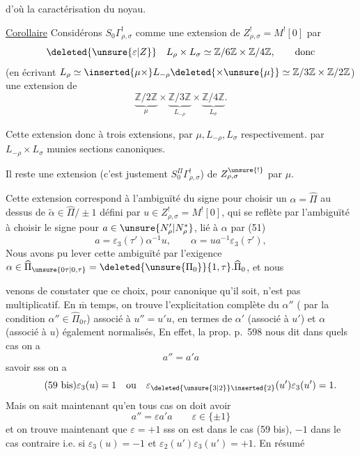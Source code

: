 
d'où la caractérisation du noyau.

\uline{Corollaire} Considérons  $S_0\Gamma^!_{\rho,\sigma}$ comme une extension de $Z^!_{\rho,\sigma}=M^![0]$ par
\[
\deleted{\unsure{\varepsilon|Z}}\quad
L_\rho\times L_\sigma\simeq\mathbb Z/6\mathbb Z\times\mathbb Z/4\mathbb Z,
\qquad\text{donc}
\]
(en écrivant $L_\rho\simeq\inserted{\mu\times}L_{-\rho}\deleted{\times\unsure{\mu}}\simeq\mathbb Z/3\mathbb Z\times\mathbb Z/2\mathbb Z$)
une extension de
\[
\underbrace{\mathbb Z/2\mathbb Z}_{\mu}\times
\underbrace{\mathbb Z/3\mathbb Z}_{L_{-\rho}}\times
\underbrace{\mathbb Z/4\mathbb Z}_{L_\sigma}.
\]


Cette extension  donc  à trois extensions, par $\mu,L_{-\rho},L_\sigma$ respectivement.   par $L_{-\rho}\times L_\sigma$  munies  sections canoniques.

Il reste une extension (c'est justement $S_0^\Pi\Gamma^!_{\rho,\sigma}$) de $Z^{\unsure{!}}_{\rho,\sigma}$ par $\mu$.

Cette extension correspond  à l'ambiguïté du signe pour choisir un $\alpha=\widehat\Pi$ au dessus de $\widetilde\alpha\in\widehat\Pi/\pm1$ défini par $u\in Z^!_{\rho,\sigma}=M^![0]$, qui se reflète par l'ambiguïté à choisir le signe pour $a\in\unsure{N'_\rho|N_\rho^*}$, lié à $\alpha$ par (51)
\[
\tag{58}
a=\varepsilon_3(\tau')\alpha^{-1}u,
\qquad \alpha=ua^{-1}\varepsilon_3(\tau'),
\]
Nous avons pu lever cette ambiguïté par l'exigence
$\alpha\in\widehat\Pi_{\unsure{0\tau|0,\tau}}=\deleted{\unsure{\Pi_0}}\{1,\tau\}.\widehat\Pi_0$, et nous



venons de constater que ce choix, pour canonique qu'il soit, n'est pas multiplicatif. En $\overline{\mathrm m}$ temps, on trouve l'explicitation complète du $\alpha''$ (  par la condition $\alpha''\in\widehat\Pi_{0\tau}$) associé à $u''=u'u$, en termes de $\alpha'$ (associé à $u'$) et $\alpha$ (associé à $u$) également normalisés,  En effet, la prop. p.\ 598 nous dit dans quels cas  on a
\[
\tag{59} a''=a'a
\]
savoir sss on a
\[
\tag{59 bis}
\varepsilon_3(u)=1\quad\text{ou}\quad
\varepsilon_{\deleted{\unsure{3|2}}\inserted{2}}(u')\varepsilon_3(u')=1.
\]
Mais on sait maintenant qu'en tous cas on doit avoir
\[
\tag{60}
a''=\varepsilon a'a\qquad \varepsilon\in\{\pm1\}
\]
et on trouve maintenant que $\varepsilon=+1$ sss on est dans le cas (59 bis), $-1$ dans le cas contraire i.e. si $\varepsilon_3(u)=-1$ et $\varepsilon_2(u')\varepsilon_3(u')=+1$. En résumé

